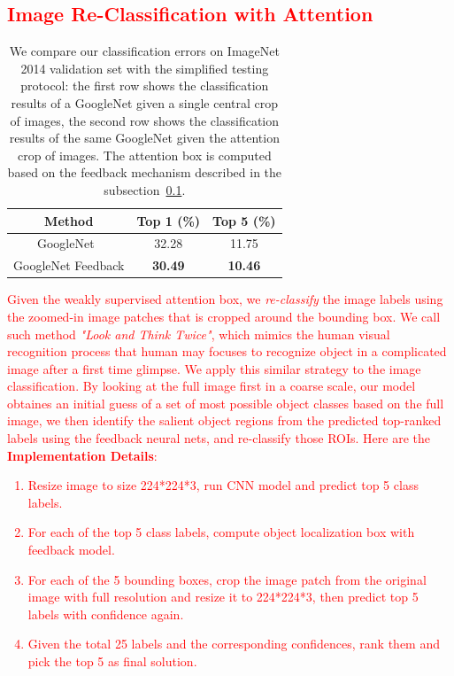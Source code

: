 \textcolor{red}{
\subsection{Image Re-Classification with Attention}
\label{subsec:re-classification}
}

\begin{table}
\centering
\small
\begin{tabular}{|c|c|c|}
\hline
Method & Top 1 (\%) & Top 5 (\%) \\ \hline
GoogleNet~\cite{Szegedy2014Going} & 32.28 & 11.75 \\ \hline
GoogleNet Feedback & \textbf{30.49} & \textbf{10.46} \\ \hline
\end{tabular}
\caption{\color{red} We compare our classification errors on ImageNet 2014 validation set with the simplified testing protocol: the first row shows the classification results of a GoogleNet given a single central crop of images, the second row shows the classification results of the same GoogleNet given the attention crop of images. The attention box is computed based on the feedback mechanism described in the subsection~\ref{subsec:re-classification}.
}
\label{tab:reclassification_error}
\end{table}

\textcolor{red}{
Given the weakly supervised attention box, we {\em re-classify} the image labels using the zoomed-in image patches that is cropped around the bounding box. We call such method {\em "Look and Think Twice"}, which mimics the human visual recognition process that human may focuses to recognize object in a complicated image after a first time glimpse. We apply this similar strategy to the image classification. By looking at the full image first in a coarse scale, our model obtaines an initial guess of a set of most possible object classes based on the full image, we then identify the salient object regions from the predicted top-ranked labels using the feedback neural nets, and re-classify those ROIs. Here are the \textbf{Implementation Details}:
}

\textcolor{red}{
\begin{enumerate}
\item Resize image to size 224*224*3, run CNN model and predict top 5 class labels.
\item For each of the top 5 class labels, compute object localization box with feedback model.
\item For each of the 5 bounding boxes, crop the image patch from the original image with full resolution and resize it to 224*224*3, then predict top 5 labels with confidence again.
\item Given the total 25 labels and the corresponding confidences, rank them and pick the top 5 as final solution.
\end{enumerate}
}

